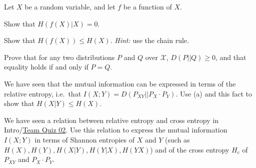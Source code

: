 \documentclass[a4paper,10pt,landscape,twocolumn]{scrartcl}
\begin{document}
\begin{exercise}
Let $X$ be a random variable, and let $f$ be a function of $X$.
	\begin{subex}[(1pt)]
	Show that $H(f(X) | X) = 0$.
	\end{subex}
	\begin{subex}[(2pt)]
	Show that $H(f(X)) \leq H(X)$. \emph{Hint:} use the chain rule.
	\end{subex}
\end{exercise}


\begin{exercise}
	\begin{subex}[(5pt)]
	Prove that for any two distributions $P$ and $Q$ over $\mathcal{X}$, $D(P||Q) \geq 0$, and that equality holds if and only if $P = Q$.
	\end{subex}
	\begin{subex}[(1pt)]
	We have seen that the mutual information can be expressed in
        terms of the relative entropy, i.e.\ that $I(X;Y) =
        D(P_{XY}||P_X \cdot P_Y)$. Use (a) and this fact to show that $H(X|Y) \leq H(X)$.
	\end{subex}
	\begin{subex}[(2pt)]
	We have seen a relation between relative entropy and cross
        entropy in Intro/\href{https://canvas.uva.nl/courses/2205/assignments/27821}{Team Quiz 02}. Use this relation to express
        the mutual information $I(X;Y)$ in terms of Shannon entropies
        of $X$ and $Y$ (such as $H(X), H(Y), H(X|Y), H(Y|X), H(YX)$) and of the cross entropy $H_c$ of $P_{XY}$ and $P_X
        \cdot P_Y$.
	\end{subex}
\end{exercise}
\end{document}

